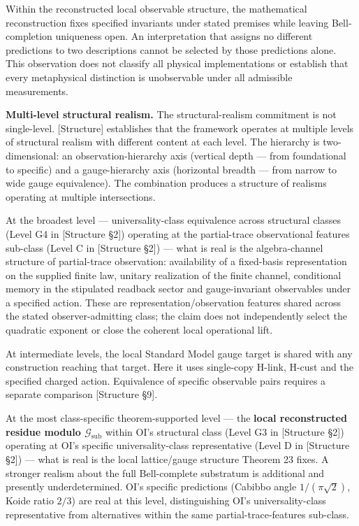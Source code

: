 \documentclass[
]{article}
\begin{document}
Within the reconstructed local observable structure, the mathematical
reconstruction fixes specified invariants under stated premises while
leaving Bell-completion uniqueness open. An interpretation that assigns
no different predictions to two descriptions cannot be selected by those
predictions alone. This observation does not classify all physical
implementations or establish that every metaphysical distinction is
unobservable under all admissible measurements.

\textbf{Multi-level structural realism.} The structural-realism
commitment is not single-level. {[}Structure{]} establishes that the
framework operates at multiple levels of structural realism with
different content at each level. The hierarchy is two-dimensional: an
observation-hierarchy axis (vertical depth --- from foundational to
specific) and a gauge-hierarchy axis (horizontal breadth --- from narrow
to wide gauge equivalence). The combination produces a structure of
realisms operating at multiple intersections.

At the broadest level --- universality-class equivalence across
structural classes (Level G4 in {[}Structure §2{]}) operating at the
partial-trace observational features sub-class (Level C in {[}Structure
§2{]}) --- what is real is the algebra-channel structure of
partial-trace observation: availability of a fixed-basis representation
on the supplied finite law, unitary realization of the finite channel,
conditional memory in the stipulated readback sector and gauge-invariant
observables under a specified action. These are
representation/observation features shared across the stated
observer-admitting class; the claim does not independently select the
quadratic exponent or close the coherent local operational lift.

At intermediate levels, the local Standard Model gauge target is shared
with any construction reaching that target. Here it uses single-copy
H-link, H-cust and the specified charged action. Equivalence of specific
observable pairs requires a separate comparison {[}Structure §9{]}.

At the most class-specific theorem-supported level --- the \textbf{local
reconstructed residue modulo \(\mathcal{G}_{\text{sub}}\)} within OI's
structural class (Level G3 in {[}Structure §2{]}) operating at OI's
specific universality-class representative (Level D in {[}Structure
§2{]}) --- what is real is the local lattice/gauge structure Theorem 23
fixes. A stronger realism about the full Bell-complete substratum is
additional and presently underdetermined. OI's specific predictions
(Cabibbo angle \(1/(\pi\sqrt{2})\), Koide ratio \(2/3\)) are real at
this level, distinguishing OI's universality-class representative from
alternatives within the same partial-trace-features sub-class.
\end{document}
